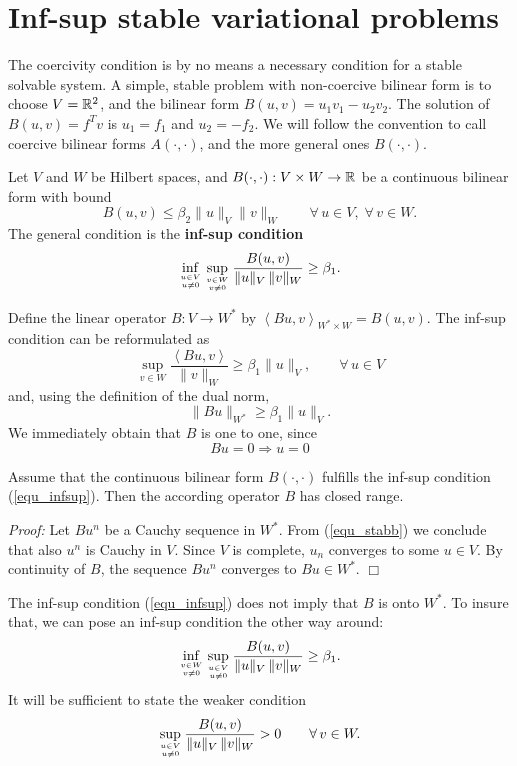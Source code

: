 \section{Inf-sup stable variational problems}

The coercivity condition is by no means a necessary condition for a
stable solvable system. A simple, stable problem with non-coercive
bilinear form is to choose $V = {\mathbb R}^2$, and the bilinear form 
$B(u,v) = u_1 v_1 - u_2 v_2$. The solution of $B(u,v) = f^T v$ is 
$u_1 = f_1$ and $u_2 = -f_2$. We will follow the convention to call
coercive bilinear forms $A(\cdot,\cdot)$, and the more general ones $B(\cdot,\cdot)$.

Let $V$ and $W$ be Hilbert spaces, and $B(\cdot,\cdot) : V \times W \rightarrow {\mathbb R}$ be a continuous bilinear form with bound
\begin{equation}
B(u,v) \leq \beta_2 \| u \|_V \| v \|_W \qquad \forall \, u \in V, \; \forall \, v \in W.
\end{equation}
The general condition is the {\bf inf-sup condition}
\begin{equation} \label{equ_infsup}
\inf_{u \in V \atop u \neq 0} \sup_{v \in W \atop v \neq 0}
\frac{ B(u,v) } { \| u \|_V \, \| v \|_W } \geq \beta_1.
\end{equation}

Define the linear operator $B : V \rightarrow W^\ast$ by $\left< B u, v \right>_{W^\ast \times W} = B(u,v)$. The inf-sup condition can be reformulated as
$$
\sup_{v \in W} \frac{ \left< B u, v \right> } { \| v \|_W } \geq \beta_1 \| u \|_V, \qquad \forall \, u \in V
$$
and, using the definition of the dual norm,
\begin{equation} \label{equ_stabb}
\| B u \|_{W^\ast} \geq \beta_1 \| u \|_V.
\end{equation}
We immediately obtain that $B$ is one to one, since
$$
B u = 0 \Rightarrow u = 0
$$
\begin{lemma} Assume that the continuous bilinear form $B(\cdot,\cdot)$ fulfills the
inf-sup condition (\ref{equ_infsup}). Then the according operator $B$ has
closed range.
\end{lemma}
{\em Proof:} Let $B u^n$ be a Cauchy sequence in $W^\ast$. From (\ref{equ_stabb}) we conclude that also $u^n$ is Cauchy in $V$. Since $V$ is complete, $u_n$
converges to some $u \in V$. By continuity of $B$, the sequence $B u^n$ converges to $B u \in W^\ast$.
\hfill $\Box$

The inf-sup condition (\ref{equ_infsup}) does not imply that $B$ is onto $W^\ast$. To insure that, we can pose an inf-sup condition the other way around:
\begin{equation} \label{equ_infsupb}
\inf_{v \in W \atop v \neq 0} \sup_{u \in V \atop u \neq 0}
\frac{ B(u,v) } { \| u \|_V \, \| v \|_W } \geq \beta_1.
\end{equation}
It will be sufficient to state the weaker condition
\begin{equation} \label{equ_infsup2}
\sup_{u \in V \atop u \neq 0}
\frac{ B(u,v) } { \| u \|_V \, \| v \|_W } > 0 \qquad \forall \, v \in W.
\end{equation}

